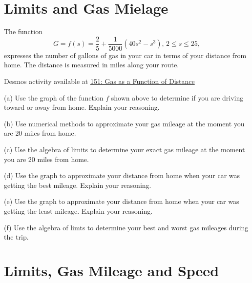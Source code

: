 \documentclass{ximera}
\begin{document}
\section{Limits and Gas Mielage}
\begin{example} \label{Ex:9sd8gfs}
The function 
\[
   G = f(s) = \frac{2}{5} +\frac{1}{5000}(40s^2 - s^3) , \, 2\leq s \leq 25 ,
\]
expresses the number of gallons of gas in your car in terms of your distance from home. The distance is measured in miles along your route. 

\begin{onlineOnly}
    \begin{center}
\end{center}
\end{onlineOnly}

Desmos activity available at
\href{https://www.desmos.com/calculator/e2uxt3o4sr}{151: Gas as a Function of Distance}


(a) Use the graph of the function $f$ shown above to determine if you are driving toward or away from home. Explain your reasoning.

(b) Use numerical methods to approximate your gas mileage at the moment you are $20$ miles from home.

(c) Use the algebra of limits to determine your exact gas mileage at the moment you are $20$ miles from home.

(d) Use the graph to approximate your distance from home when your car was getting the best mileage. Explain your reasoning. 

(e) Use the graph to approximate your distance from home when your car was getting the least mileage. Explain your reasoning. 

(f) Use the algebra of limts to determine your best and worst gas mileages during the trip.



\end{example}



\section{Limits, Gas Mileage and Speed}
\end{document}
